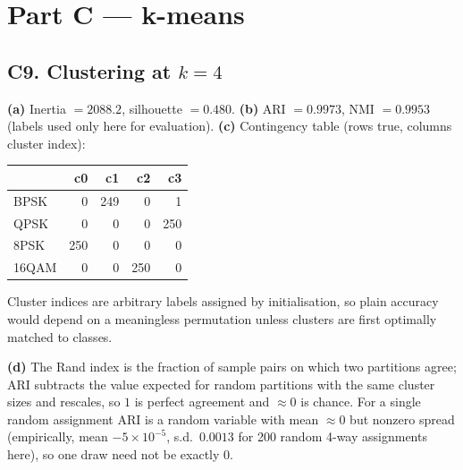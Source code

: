 \documentclass[10pt,a4paper]{article}
\begin{document}
\section*{Part C --- k-means}
\subsection*{C9. Clustering at $k=4$}
\textbf{(a)} Inertia $=2088.2$, silhouette $=0.480$. \textbf{(b)} ARI $=0.9973$, NMI $=0.9953$ (labels used only here for evaluation).
\textbf{(c)} Contingency table (rows true, columns cluster index):
\begin{center}\begin{tabular}{lrrrr}\toprule&c0&c1&c2&c3\\\midrule BPSK&0&249&0&1\\QPSK&0&0&0&250\\8PSK&250&0&0&0\\16QAM&0&0&250&0\\\bottomrule\end{tabular}\end{center}
Cluster indices are arbitrary labels assigned by initialisation, so plain accuracy would depend on a meaningless permutation unless clusters are first optimally matched to classes.

\textbf{(d)} The Rand index is the fraction of sample pairs on which two partitions agree; ARI subtracts the value expected for random partitions with the same cluster sizes and rescales, so $1$ is perfect agreement and $\approx0$ is chance. For a single random assignment ARI is a random variable with mean $\approx0$ but nonzero spread (empirically, mean $-5\times10^{-5}$, s.d.\ $0.0013$ for 200 random 4-way assignments here), so one draw need not be exactly 0.
\end{document}
